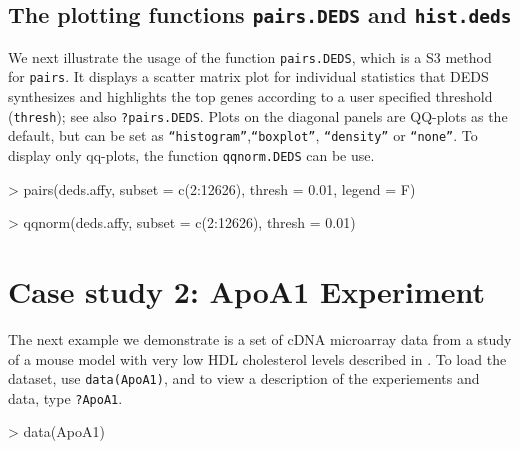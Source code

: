 \documentclass[11pt]{article}
\newcommand{\code}[1]{{\tt #1}}
\newcommand{\Rfunc}[1]{{\tt #1}}
\newcommand{\myincfig}[3]{%
  \begin{figure}[htbp]
    \begin{center}
      \texttt{[image: \#1]}
      \caption{\label{#1}#3}
    \end{center}
  \end{figure}
}
\begin{document}
\subsection{The plotting functions \Rfunc{pairs.DEDS} and \Rfunc{hist.deds}}
We next illustrate the usage of the function \code{pairs.DEDS}, which is 
a S3 method for \code{pairs}. It displays a scatter matrix plot for 
individual statistics that DEDS synthesizes and highlights the top genes
according to a user specified threshold (\code{thresh}); see also
\code{?pairs.DEDS}. Plots on the diagonal panels are QQ-plots as the
default, but can be set as \code{``histogram''},\code{``boxplot''}, 
\code{``density''} or \code{``none''}. To display only qq-plots, the function 
\code{qqnorm.DEDS} can be use.

\begin{Schunk}
\begin{Sinput}
> pairs(deds.affy, subset = c(2:12626), thresh = 0.01, legend = F)
\end{Sinput}
\end{Schunk}

\begin{Schunk}
\begin{Sinput}
> qqnorm(deds.affy, subset = c(2:12626), thresh = 0.01)
\end{Sinput}
\end{Schunk}


\section{Case study 2: ApoA1 Experiment}
The next example we demonstrate is a set of cDNA microarray data from a study of a
mouse model with very low HDL cholesterol levels described in
\cite{Dudoitetal02}. To load the dataset, use
\code{data(ApoA1)}, and to view a description of the experiements
and data, type \code{?ApoA1}.

\begin{Schunk}
\begin{Sinput}
> data(ApoA1)
\end{Sinput}
\end{Schunk}
\end{document}

